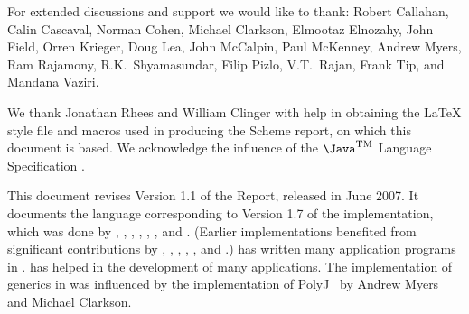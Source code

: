 For extended discussions and support we would like to thank: 
Robert Callahan, Calin
Cascaval, Norman Cohen, Michael Clarkson, Elmootaz Elnozahy, John Field,
Orren Krieger, Doug Lea, John McCalpin, Paul McKenney, Andrew Myers,
Ram Rajamony,
R.K.~Shyamasundar, Filip Pizlo, V.T.~Rajan, Frank Tip, and Mandana Vaziri.

We thank Jonathan Rhees and William Clinger with help in obtaining the
\LaTeX{} style file and macros used in producing the Scheme report,
on which this document is based. We acknowledge the influence of
the $\mbox{\Java}^{\mbox{\textsc{tm}}}$ Language
Specification \cite{jls2}.

This document revises Version 1.1 of the Report, released in
June 2007.  It documents the language corresponding to Version
1.7 of the implementation, which was done by
, 
,  
,  
,
,  
, and
.
(Earlier implementations benefited from significant contributions by
, 
, 
,
,
, and
.)
 has written many application programs
in \Xten{}.  has helped in the
development of many applications.
The implementation of generics in \Xten{} was influenced by the
implementation of PolyJ~\cite{polyj} by Andrew Myers and Michael Clarkson.

